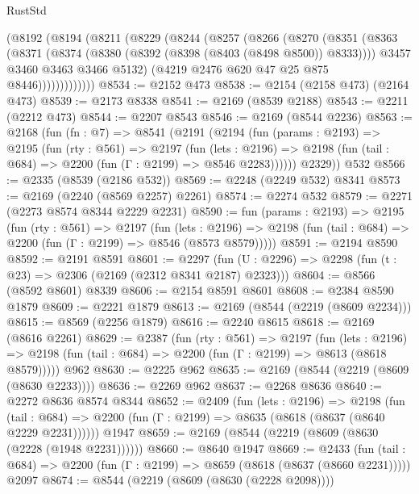 \begin{lexlean}{RustStd}
\begin{coremodule}
        (@8192
          (@8194
            (@8211
              (@8229
                (@8244
                  (@8257
                    (@8266
                      (@8270
                        (@8351
                          (@8363
                            (@8371
                              (@8374 (@8380 (@8392 (@8398 (@8403 (@8498 @8500)) @8333))))
                              @3457
                              @3460
                              @3463
                              @3466
                              @5132)
                            (@4219 @2476 @620 @47 @25 @875 @8446)))))))))))))
@8534 := @2152 @473
@8538 := @2154 (@2158 @473) (@2164 @473)
@8539 := @2173 @8338
@8541 := @2169 (@8539 @2188)
@8543 := @2211 (@2212 @473)
@8544 := @2207 @8543
@8546 := @2169 (@8544 @2236)
@8563 := @2168
    (fun (fn : @7) =>
    @8541
      (@2191
        (@2194
          (fun (params : @2193) =>
          @2195
            (fun (rty : @561) =>
            @2197
              (fun (lets : @2196) =>
              @2198 (fun (tail : @684) => @2200 (fun (Γ : @2199) => @8546 @2283))))))
        @2329))
    @532
@8566 := @2335 (@8539 (@2186 @532))
@8569 := @2248 (@2249 @532) @8341
@8573 := @2169 (@2240 (@8569 @2257) @2261)
@8574 := @2274 @532
@8579 := @2271 (@2273 @8574 @8344 @2229 @2231)
@8590 := fun (params : @2193) =>
  @2195
    (fun (rty : @561) =>
    @2197
      (fun (lets : @2196) =>
      @2198 (fun (tail : @684) => @2200 (fun (Γ : @2199) => @8546 (@8573 @8579)))))
@8591 := @2194 @8590
@8592 := @2191 @8591
@8601 := @2297 (fun (U : @2296) => @2298 (fun (t : @23) => @2306 (@2169 (@2312 @8341 @2187) @2323)))
@8604 := @8566 (@8592 @8601) @8339
@8606 := @2154 @8591 @8601
@8608 := @2384 @8590 @1879
@8609 := @2221 @1879
@8613 := @2169 (@8544 (@2219 (@8609 @2234)))
@8615 := @8569 (@2256 @1879)
@8616 := @2240 @8615
@8618 := @2169 (@8616 @2261)
@8629 := @2387
    (fun (rty : @561) =>
    @2197
      (fun (lets : @2196) =>
      @2198 (fun (tail : @684) => @2200 (fun (Γ : @2199) => @8613 (@8618 @8579)))))
    @962
@8630 := @2225 @962
@8635 := @2169 (@8544 (@2219 (@8609 (@8630 @2233))))
@8636 := @2269 @962
@8637 := @2268 @8636
@8640 := @2272 @8636 @8574 @8344
@8652 := @2409
    (fun (lets : @2196) =>
    @2198
      (fun (tail : @684) => @2200 (fun (Γ : @2199) => @8635 (@8618 (@8637 (@8640 @2229 @2231))))))
    @1947
@8659 := @2169 (@8544 (@2219 (@8609 (@8630 (@2228 (@1948 @2231))))))
@8660 := @8640 @1947
@8669 := @2433
    (fun (tail : @684) => @2200 (fun (Γ : @2199) => @8659 (@8618 (@8637 (@8660 @2231)))))
    @2097
@8674 := @8544 (@2219 (@8609 (@8630 (@2228 @2098))))

\end{coremodule}
\end{lexlean}
